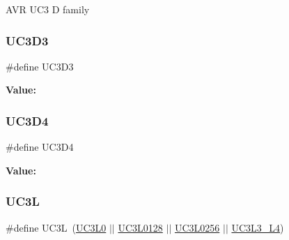 A\+VR U\+C3 D family \mbox{\label{group__uc3__part__macros__group_ga432af70c4d53fc917770e4ce48440613}} 
\subsubsection{\texorpdfstring{UC3D3}{UC3D3}}
{\footnotesize\ttfamily \#define U\+C3\+D3}

{\bfseries Value\+:}
\begin{DoxyCode}{0}
\DoxyCodeLine{(   \(\backslash\)}
\DoxyCodeLine{        )}

\end{DoxyCode}
\mbox{\label{group__uc3__part__macros__group_gae271cf5f4b9459baea7216c071e02d76}} 
\subsubsection{\texorpdfstring{UC3D4}{UC3D4}}
{\footnotesize\ttfamily \#define U\+C3\+D4}

{\bfseries Value\+:}
\begin{DoxyCode}{0}
\DoxyCodeLine{(   \(\backslash\)}
\DoxyCodeLine{        )}

\end{DoxyCode}
\mbox{\label{group__uc3__part__macros__group_gac8a7d715e500aa74cd05e0f0fc5bb005}} 
\subsubsection{\texorpdfstring{UC3L}{UC3L}}
{\footnotesize\ttfamily \#define U\+C3L~(\mbox{\hyperlink{group__uc3__part__macros__group_ga4a399e061cd2bf1088c01a22f69cf6c1}{U\+C3\+L0}} $\vert$$\vert$ \mbox{\hyperlink{group__uc3__part__macros__group_ga2acf2e6f59e322e343123ad12fe89c2c}{U\+C3\+L0128}} $\vert$$\vert$ \mbox{\hyperlink{group__uc3__part__macros__group_gaa8ab88d4e48e7936416c4475b42e5b49}{U\+C3\+L0256}} $\vert$$\vert$ \mbox{\hyperlink{group__uc3__part__macros__group_gae4dccd708991a86a5e8598b0c72d6bbd}{U\+C3\+L3\+\_\+\+L4}})}


